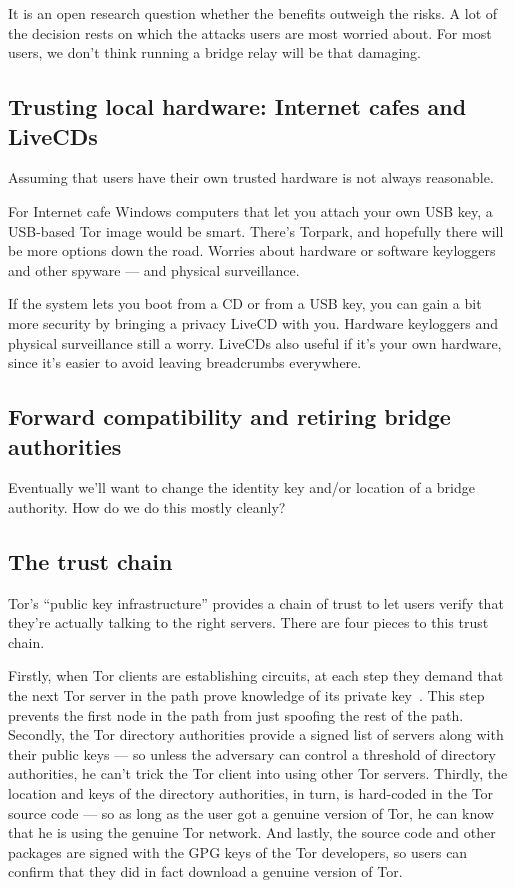\documentclass{llncs}
\begin{document}
It is an open research question whether the benefits outweigh the risks. A
lot of the decision rests on which the attacks users are most worried
about. For most users, we don't think running a bridge relay will be
that damaging.

\subsection{Trusting local hardware: Internet cafes and LiveCDs}
\label{subsec:cafes-and-livecds}

Assuming that users have their own trusted hardware is not
always reasonable.

For Internet cafe Windows computers that let you attach your own USB key,
a USB-based Tor image would be smart. There's Torpark, and hopefully
there will be more options down the road. Worries about hardware or
software keyloggers and other spyware --- and physical surveillance.

If the system lets you boot from a CD or from a USB key, you can gain
a bit more security by bringing a privacy LiveCD with you. Hardware
keyloggers and physical surveillance still a worry. LiveCDs also useful
if it's your own hardware, since it's easier to avoid leaving breadcrumbs
everywhere.

\subsection{Forward compatibility and retiring bridge authorities}

Eventually we'll want to change the identity key and/or location
of a bridge authority. How do we do this mostly cleanly?

\subsection{The trust chain}
\label{subsec:trust-chain}

Tor's ``public key infrastructure'' provides a chain of trust to
let users verify that they're actually talking to the right servers.
There are four pieces to this trust chain.

Firstly, when Tor clients are establishing circuits, at each step
they demand that the next Tor server in the path prove knowledge of
its private key~\cite{tor-design}. This step prevents the first node
in the path from just spoofing the rest of the path. Secondly, the
Tor directory authorities provide a signed list of servers along with
their public keys --- so unless the adversary can control a threshold
of directory authorities, he can't trick the Tor client into using other
Tor servers. Thirdly, the location and keys of the directory authorities,
in turn, is hard-coded in the Tor source code --- so as long as the user
got a genuine version of Tor, he can know that he is using the genuine
Tor network. And lastly, the source code and other packages are signed
with the GPG keys of the Tor developers, so users can confirm that they
did in fact download a genuine version of Tor.
\end{document}

